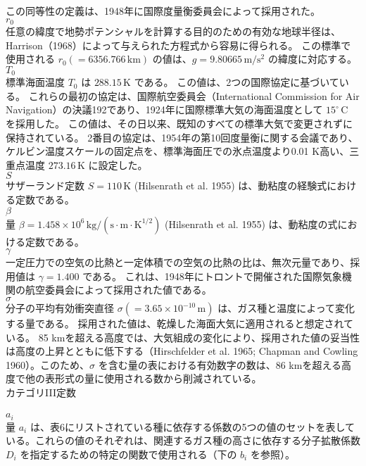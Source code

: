 \documentclass{article}
\begin{document}
この同等性の定義は、1948年に国際度量衡委員会によって採用された。
\\$r_0$\\
任意の緯度で地勢ポテンシャルを計算する目的のための有効な地球半径は、Harrison（1968）によって与えられた方程式から容易に得られる。
この標準で使用される $r_0 (= 6356.766 \, \mathrm{km})$ の値は、$g = 9.80665 \, \mathrm{m/s^2}$ の緯度に対応する。
\\$T_0$\\
標準海面温度 $T_0$ は $288.15 \, \mathrm{K}$ である。
この値は、2つの国際協定に基づいている。
これらの最初の協定は、国際航空委員会（International Commission for Air Navigation）の決議192であり、1924年に国際標準大気の海面温度として $15^\circ \, \mathrm{C}$ を採用した。
この値は、その日以来、既知のすべての標準大気で変更されずに保持されている。
2番目の協定は、1954年の第10回度量衡に関する会議であり、ケルビン温度スケールの固定点を、標準海面圧での氷点温度より0.01 K高い、三重点温度 $273.16 \, \mathrm{K}$ に設定した。
\\$S$\\
サザーランド定数 $S = 110 \, \mathrm{K}$ (Hilsenrath et al. 1955) は、動粘度の経験式における定数である。
\\$\beta$\\
量 $\beta = 1.458 \times 10^{6} \, \mathrm{kg/(s \cdot m \cdot K^{1/2})}$ (Hilsenrath et al. 1955) は、動粘度の式における定数である。
\\$\gamma$\\
一定圧力での空気の比熱と一定体積での空気の比熱の比は、無次元量であり、採用値は $\gamma = 1.400$ である。
これは、1948年にトロントで開催された国際気象機関の航空委員会によって採用された値である。
\\$\sigma$\\
分子の平均有効衝突直径 $\sigma (= 3.65 \times 10^{-10} \, \mathrm{m})$ は、ガス種と温度によって変化する量である。
採用された値は、乾燥した海面大気に適用されると想定されている。
85 kmを超える高度では、大気組成の変化により、採用された値の妥当性は高度の上昇とともに低下する（Hirschfelder et al. 1965; Chapman and Cowling 1960）。このため、$\sigma$ を含む量の表における有効数字の数は、86 kmを超える高度で他の表形式の量に使用される数から削減されている。
\\カテゴリIII定数\\
\\$a_i$\\
量 $a_i$ は、表6にリストされている種に依存する係数の5つの値のセットを表している。これらの値のそれぞれは、関連するガス種の高さに依存する分子拡散係数 $D_i$ を指定するための特定の関数で使用される（下の $b_i$ を参照）。
\end{document}
